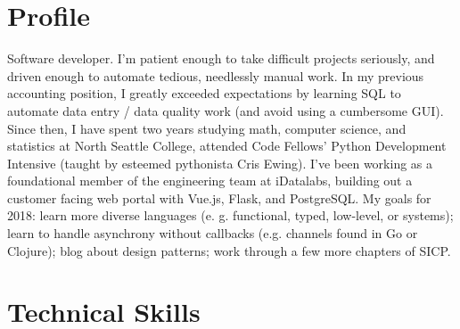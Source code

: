 \documentclass[10pt,a4paper,sans]{moderncv}        %
\begin{document}
\makecvtitle

\section{Profile}
Software developer. I'm patient enough to take difficult projects seriously, and
driven enough to automate tedious, needlessly manual work. In my previous
accounting position, I greatly exceeded expectations by learning SQL to automate
data entry / data quality work (and avoid using a cumbersome GUI). Since
then, I have spent two years studying math, computer science, and statistics at
North Seattle College, attended Code Fellows' Python Development Intensive
(taught by esteemed pythonista Cris Ewing). I've been working as a foundational
member of the engineering team at iDatalabs, building out a customer facing web
portal with Vue.js, Flask, and PostgreSQL. My goals for 2018: learn more diverse
languages (e. g. functional, typed, low-level, or systems); learn to handle
asynchrony without callbacks (e.g. channels found in Go or Clojure); blog about
design patterns; work through a few more chapters of SICP.

\section{Technical Skills}
\begin{cvcolumns}
\end{cvcolumns}

\begin{comment}
  \section{Technical Skills}
  \subsection{Proficient}
  Python, Django, Django REST Framework, Pyramid, Git, SQL, HTML/CSS,
  JavaScript/jQuery, Unix systems, Shell Scripting, Org-mode, Regular
  Expressions
  \subsection{Familiar}
  AWS Deployment, Heroku Deployment, Ansible, PostgreSQL, Nginx, Gunicorn,
  Scheme, Sed
\end{comment}
\end{document}
